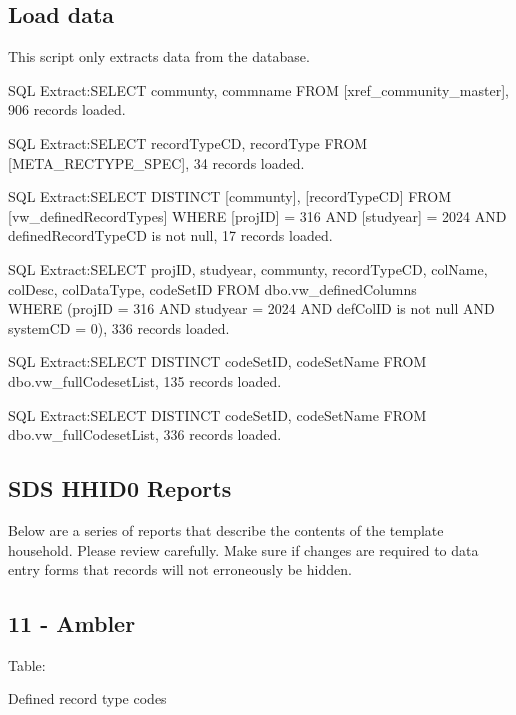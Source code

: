 \documentclass[
]{article}
\begin{document}
\subsection{Load data}\label{load-data}

This script only extracts data from the database.

SQL Extract:SELECT communty, commname FROM
{[}xref\_community\_master{]}, 906 records loaded.

SQL Extract:SELECT recordTypeCD, recordType FROM
{[}META\_RECTYPE\_SPEC{]}, 34 records loaded.

SQL Extract:SELECT DISTINCT {[}communty{]}, {[}recordTypeCD{]} FROM
{[}vw\_definedRecordTypes{]} WHERE {[}projID{]} = 316 AND {[}studyear{]}
= 2024 AND definedRecordTypeCD is not null, 17 records loaded.

SQL Extract:SELECT projID, studyear, communty, recordTypeCD, colName,
colDesc, colDataType, codeSetID FROM dbo.vw\_definedColumns\\
WHERE (projID = 316 AND studyear = 2024 AND defColID is not null AND
systemCD = 0), 336 records loaded.

SQL Extract:SELECT DISTINCT codeSetID, codeSetName FROM
dbo.vw\_fullCodesetList, 135 records loaded.

SQL Extract:SELECT DISTINCT codeSetID, codeSetName FROM
dbo.vw\_fullCodesetList, 336 records loaded.

\subsection{SDS HHID0 Reports}\label{sds-hhid0-reports}

Below are a series of reports that describe the contents of the template
household. Please review carefully. Make sure if changes are required to
data entry forms that records will not erroneously be hidden.

\subsection{\texorpdfstring{11 - Ambler }{11 - Ambler  }}\label{ambler}

Table:

Defined record type codes
\end{document}
